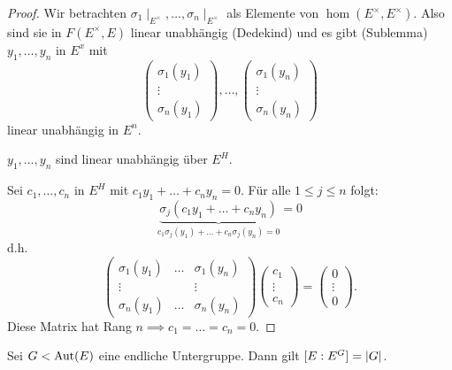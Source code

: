 \begin{proof}
	Wir betrachten $\sigma_1 \mid_{E^{\times}},\ldots, \sigma_{n} \mid_{E^{\times}}$ als Elemente von $\hom(E^{\times}, E^{\times})$.
	Also sind sie in $F(E^{\times }, E)$ linear unabhängig (Dedekind) und es gibt (Sublemma) $y_1,\ldots,y_{n} $ in $E^{x} $ mit
	\[
		\begin{pmatrix} \sigma_1(y_1) \\ \vdots \\ \sigma_{n}(y_1) \end{pmatrix} ,\ldots, \begin{pmatrix} \sigma_1(y_{n}) \\ \vdots \\ \sigma_{n}(y_{n}) \end{pmatrix} 
	\] 
	linear unabhängig in $E^{n}$.
	\begin{claim}
		$y_1,\ldots,y_{n}$ sind linear unabhängig über  $E^{H}$.
	\end{claim}
	Sei $c_1,\ldots, c_{n} $ in $E^{H}$ mit $c_1 y_1 + \ldots + c_{n} y_{n} = 0$. Für alle $1 \leq j \leq n$ folgt:
	\[
		\underbrace{\sigma_{j}(c_1 y_1 + \ldots + c_{n} y_{n})}_{c_1 \sigma_{j}(y_1) + \ldots + c_{n} \sigma_{j}(y_{n}) = 0} = 0 
	\] 
	d.h.
	\[
	\begin{pmatrix} 
		\sigma_{1}(y_1) &\ldots &\sigma_{1}(y_{n})\\
		\vdots &&\vdots\\
		\sigma_{n}(y_1) &\ldots &\sigma_{n}(y_{n})
	\end{pmatrix}
	\begin{pmatrix} 
		c_1\\ \vdots\\ c_{n}
	\end{pmatrix} = \begin{pmatrix} 
		0\\ \vdots\\ 0
	\end{pmatrix} 
	.\] 
	Diese Matrix hat Rang $n \implies c_1 = \ldots = c_{n} = 0$.
\end{proof}

\begin{proposition}
	Sei $G < \operatorname{Aut}(E)$ eine endliche Untergruppe. Dann gilt $[E : E^{G}] = \abs{G}$.
\end{proposition}


